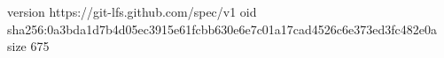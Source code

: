 version https://git-lfs.github.com/spec/v1
oid sha256:0a3bda1d7b4d05ec3915e61fcbb630e6e7c01a17cad4526c6e373ed3fc482e0a
size 675
